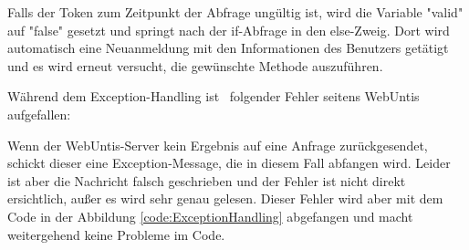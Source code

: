 

Falls der Token zum Zeitpunkt der Abfrage ungültig ist, wird die Variable "valid" auf "false" gesetzt und springt nach der if-Abfrage in den else-Zweig. Dort wird automatisch eine Neuanmeldung mit den Informationen des Benutzers getätigt und es wird erneut versucht, die gewünschte Methode auszuführen.

\pagebreak

Während dem Exception-Handling ist \ZELIA\ folgender Fehler seitens WebUntis aufgefallen:


Wenn der WebUntis-Server kein Ergebnis auf eine Anfrage zurückgesendet, schickt dieser eine Exception-Message, die in diesem Fall abfangen wird. Leider ist aber die Nachricht falsch geschrieben und der Fehler ist nicht direkt ersichtlich, außer es wird sehr genau gelesen. Dieser Fehler wird aber mit dem Code in der Abbildung \ref{code:ExceptionHandling} abgefangen und macht weitergehend keine Probleme im Code.
